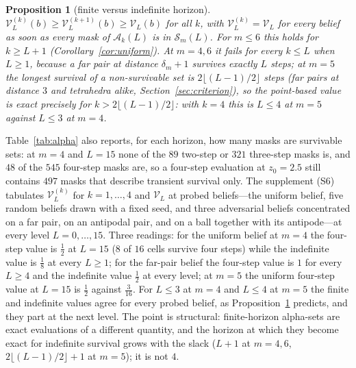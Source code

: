 \documentclass[11pt,a4paper]{article}
\theoremstyle{plain}
\newtheorem{proposition}[theorem]{Proposition}
\theoremstyle{definition}
\theoremstyle{remark}
\newcommand{\calA}{\mathcal{A}}
\newcommand{\calS}{\mathcal{S}}
\newcommand{\tfr}[2]{\tfrac{#1}{#2}}
\begin{document}
\begin{proposition}[finite versus indefinite horizon]\label{prop:pbvi}
$\mathcal V^{(k)}_L(b)\ge\mathcal V^{(k+1)}_L(b)\ge\mathcal V_L(b)$ for all $k$, with $\mathcal V^{(k)}_L=\mathcal V_L$ for every belief as soon as every mask of $\calA_k(L)$ is in $\calS_m(L)$. For $m\le6$ this holds for $k\ge L+1$ (Corollary~\ref{cor:uniform}). At $m=4,6$ it fails for every $k\le L$ when $L\ge1$, because a far pair at distance $\delta_m+1$ survives exactly $L$ steps; at $m=5$ the longest survival of a non-survivable set is $2\lfloor(L-1)/2\rfloor$ steps (far pairs at distance $3$ and tetrahedra alike, Section~\ref{sec:criterion}), so the point-based value is exact precisely for $k>2\lfloor(L-1)/2\rfloor$: with $k=4$ this is $L\le4$ at $m=5$ against $L\le3$ at $m=4$.
\end{proposition}

Table~\ref{tab:alpha} also reports, for each horizon, how many masks are survivable sets: at $m=4$ and $L=15$ none of the $89$ two-step or $321$ three-step masks is, and $48$ of the $545$ four-step masks are, so a four-step evaluation at $z_0=2.5$ still contains $497$ masks that describe transient survival only. The supplement (S6) tabulates $\mathcal V^{(k)}_L$ for $k=1,\dots,4$ and $\mathcal V_L$ at probed beliefs---the uniform belief, five random beliefs drawn with a fixed seed, and three adversarial beliefs concentrated on a far pair, on an antipodal pair, and on a ball together with its antipode---at every level $L=0,\dots,15$. Three readings: for the uniform belief at $m=4$ the four-step value is $\tfr12$ at $L=15$ ($8$ of $16$ cells survive four steps) while the indefinite value is $\tfr18$ at every $L\ge1$; for the far-pair belief the four-step value is $1$ for every $L\ge4$ and the indefinite value $\tfr12$ at every level; at $m=5$ the uniform four-step value at $L=15$ is $\tfr12$ against $\tfr3{16}$. For $L\le3$ at $m=4$ and $L\le4$ at $m=5$ the finite and indefinite values agree for every probed belief, as Proposition~\ref{prop:pbvi} predicts, and they part at the next level. The point is structural: finite-horizon alpha-sets are exact evaluations of a different quantity, and the horizon at which they become exact for indefinite survival grows with the slack ($L+1$ at $m=4,6$, $2\lfloor(L-1)/2\rfloor+1$ at $m=5$); it is not $4$.
\end{document}
